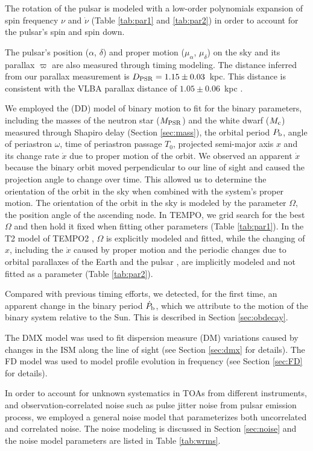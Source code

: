 The rotation of the pulsar is modeled with a low-order polynomials expansion of spin frequency 
$\nu$ and $\dot{\nu}$ (Table \ref{tab:par1} and \ref{tab:par2}) in order to account
for the pulsar's spin and spin down.

The pulsar's position ($\alpha$, $\delta$) and proper motion ($\mu_\alpha$, $
\mu_\delta$) on the sky and its parallax $\varpi$ are also measured through timing modeling. 
The distance inferred from our parallax
measurement is $D_{\rm PSR}=1.15\pm0.03$~kpc. This distance is consistent with 
the VLBA parallax distance of $1.05\pm0.06$~kpc \citep{cbv+09}.

We employed the \citet{dd86} (DD) model of binary motion to fit for the binary parameters, 
including the masses of
the neutron star ($M_{\rm PSR}$) and the white dwarf ($M_{\rm c}$) measured
through Shapiro delay (Section \ref{sec:mass}),
the orbital period $P_{\rm b}$, angle of periastron $\omega$, time of
periastron passage $T_0$, projected semi-major axis $x$ and its change rate
$\dot{x}$ due to proper motion of the orbit. 
We observed an apparent $\dot{x}$ because the binary orbit moved perpendicular
to our line of sight and caused the projection angle to change over time. This 
allowed us to determine the orientation of the orbit in the sky when combined
with the system's proper motion.
The orientation of the orbit in the sky is modeled by the
parameter $\Omega$, the position angle of the ascending node.
In {\sc TEMPO}, we grid search for the best $\Omega$ and then hold it fixed when fitting other
parameters (Table \ref{tab:par1}).
In the T2 model of {\sc TEMPO2} \citep{ehm06}, $\Omega$ is explicitly modeled and
fitted, while the changing of $x$, including the $\dot{x}$ caused by proper motion and the 
periodic changes due to orbital parallaxes of the Earth and the pulsar \citep{kop96}, are implicitly modeled and not fitted as a parameter
(Table \ref{tab:par2}).  
%


Compared with previous timing efforts, we detected, for the first time, an
apparent change in the binary period $\dot{P}_{\rm b}$, which we attribute to
the motion of the binary system relative to the Sun. This is described in Section \ref{sec:obdecay}.    

The DMX model was used to fit dispersion measure (DM) variations caused by
changes in the ISM along the line of sight (see Section \ref{sec:dmx} for details). The FD model was used to model profile
evolution in frequency (see Section \ref{sec:FD} for details). 

In order to account for unknown systematics in TOAs from different
instruments, and observation-correlated noise such as pulse jitter noise from pulsar
emission process, we employed a general noise model that parameterizes both uncorrelated and
correlated noise. The noise modeling is discussed in Section \ref{sec:noise} and the
noise model parameters are listed in Table \ref{tab:wrms}. 

